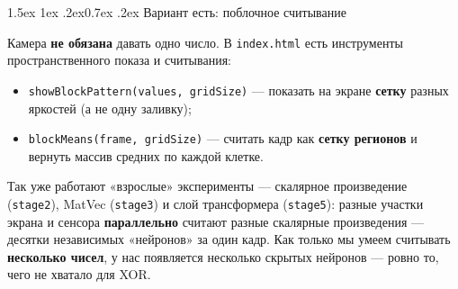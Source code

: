 \documentclass[11pt]{article}
\makeatletter
\renewcommand\section{\@startsection{section}{1}{\z@}%
  {1.5ex \@plus 1ex \@minus .2ex}{0.7ex \@plus.2ex}%
  {\sffamily\Large\bfseries\color{accent}}}
\makeatother
\begin{document}
\section{Вариант есть: поблочное считывание}

Камера \textbf{не обязана} давать одно число. В \texttt{index.html} есть
инструменты пространственного показа и считывания:

\begin{itemize}
\item \texttt{showBlockPattern(values, gridSize)} — показать на экране
\textbf{сетку} разных яркостей (а не одну заливку);
\item \texttt{blockMeans(frame, gridSize)} — считать кадр как \textbf{сетку
регионов} и вернуть массив средних по каждой клетке.
\end{itemize}

\begin{center}
\end{center}

\noindent Так уже работают «взрослые» эксперименты — скалярное произведение
(\texttt{stage2}), MatVec (\texttt{stage3}) и слой трансформера
(\texttt{stage5}): разные участки экрана и сенсора \textbf{параллельно} считают
разные скалярные произведения — десятки независимых «нейронов» за один кадр. Как
только мы умеем считывать \textbf{несколько чисел}, у нас появляется несколько
скрытых нейронов — ровно то, чего не хватало для XOR.

\end{document}
